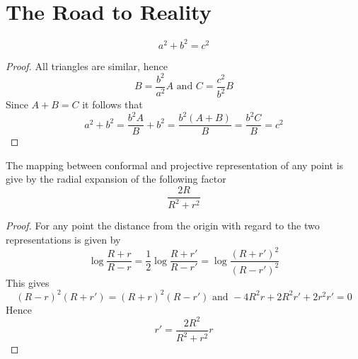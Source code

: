 
\newpage
\section{The Road to Reality}
\begin{theorem}[Pythagoras]\label{thm:thm_pythagoras}

\[
    a^2 + b^2 = c^2
\]
\end{theorem}


\begin{proof}
All triangles are similar, hence
\[
    B = \frac{b^2}{a^2} A \text{ and }  C =  \frac{c^2}{b^2} B 
\]
Since \( A + B = C \) it follows that
\[
     a^2 + b^2 = \frac{b^2A}{B} + b^2 = \frac{b^2(A + B)}{B} = \frac{b^2 C}{B} = c^2
\]
\end{proof}
\bigskip




The mapping between conformal and projective representation of any point is give by the radial expansion 
of the following factor
\[
   \frac{2R}{R^2 + r^2}
\]  

\begin{proof}
For any point the distance from the origin with regard to the two representations is given by
\[
    \log \frac{R + r}{R - r} = \frac{1}{2} \log \frac{R + r'}{R - r'} = \log \frac{(R + r')^2}{(R - r')^2}
\]
This gives
\[
   (R - r)^2 (R + r') = (R + r)^2 (R - r') \text{ and } -4R^2r + 2R^2r' + 2r^2r' = 0
\] 
Hence
\[
   r' = \frac{2R^2}{R^2 + r^2} r
\] 
\end{proof}